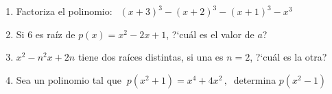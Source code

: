 \vspace{5mm}
\begin{enumerate}
\item	Factoriza el polinomio: $\ \ (x+3)^3-(x+2)^3-(x+1)^3-x^3$

\vspace{-6mm}
\begin{flushright}
\begin{footnotesize} \textcolor{gris}{}	\end{footnotesize}
\end{flushright}


\item	Si $6$ es raíz de $p(x)=x^2-2x+1$, ?`cuál es el valor de $a$?

\vspace{-6mm}
\begin{flushright}
\begin{footnotesize} \textcolor{gris}{}	\end{footnotesize}
\end{flushright}


\item	$x^2-n^2x+2n$ tiene dos raíces distintas, si una es $n=2$, ?`cuál es la otra?

\vspace{-6mm}
\begin{flushright}
\begin{footnotesize} \textcolor{gris}{}	\end{footnotesize}
\end{flushright}

%
\item	Sea un polinomio tal que $\ p(x^2+1)= x^4+4x^2\, , \ $ determina $p(x^2-1)$

\vspace{-6mm}
\begin{flushright}
\begin{footnotesize} \textcolor{gris}{}	\end{footnotesize}
\end{flushright}
\vspace{-8mm}
\begin{flushright}
\begin{footnotesize} \textcolor{gris}{}	\end{footnotesize}
\end{flushright}



\end{enumerate}
